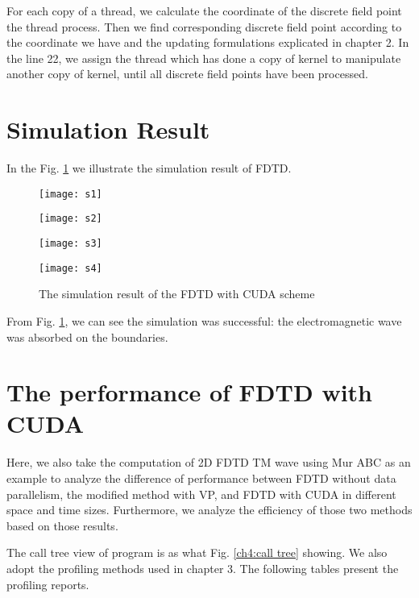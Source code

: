 For each copy of a thread, we calculate the coordinate of the discrete field point the thread process. Then we find corresponding discrete field point according to the coordinate we have and the updating formulations explicated in chapter 2. In the line 22, we assign the thread which has done a copy of kernel to manipulate another copy of kernel, until all discrete field points have been processed.

\section{Simulation Result}
In the Fig. \ref{ch4 fig:sCUDA} we illustrate the simulation result of FDTD. 

\begin{figure}
	\centering
	\begin{minipage}{0.47\textwidth}
		\centering
		\texttt{[image: s1]}
	\end{minipage}
	\begin{minipage}{0.47\textwidth}
		\centering
		\texttt{[image: s2]}
	\end{minipage}
	\newline
	\begin{minipage}{0.47\textwidth}
		\centering
		\texttt{[image: s3]}
	\end{minipage}
	\begin{minipage}{0.47\textwidth}
		\centering
		\texttt{[image: s4]}
	\end{minipage}
	\centering
	\caption{The simulation result of the FDTD with CUDA scheme}
	\label{ch4 fig:sCUDA}
\end{figure}

From Fig. \ref{ch4 fig:sCUDA}, we can see the simulation was successful: the electromagnetic wave was absorbed on the boundaries.

\section{The performance of FDTD with CUDA}

Here, we also take the computation of 2D FDTD TM wave using Mur ABC as an example to analyze the difference of performance between FDTD without data parallelism, the modified method with VP, and FDTD with CUDA in different space and time sizes. Furthermore, we analyze the efficiency of those two methods based on those results.

The call tree view of program is as what Fig. \ref{ch4:call tree} showing. We also adopt the profiling methods used in chapter 3. The following tables present the profiling reports.

